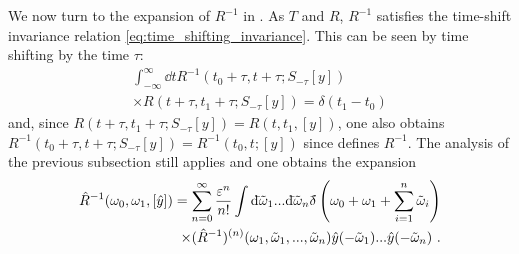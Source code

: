 \documentclass[%
 reprint,
superscriptaddress,
nofootinbib,
 amsmath,amssymb,
 aps,
prx,
]{revtex4-2}
\begin{document}
We now turn to the expansion of $R^{-1}$ in . As $T$ and $R$, $R^{-1}$ satisfies the time-shift invariance relation \eqref{eq:time_shifting_invariance}. This can be seen by time shifting  by the time $\tau$:
\begin{multline}
\int_{-\infty}^{\infty} \dd{t} R^{-1}(t_0+\tau, t+\tau;S_{-\tau}[y])\\
\times R(t+\tau, t_1+\tau;S_{-\tau}[y]) =\delta(t_1-t_0)
\end{multline}
and, since $R(t+\tau, t_1+\tau;S_{-\tau}[y]) =R(t,t_1,[y])$, one also obtains $R^{-1}(t_0+\tau, t+\tau;S_{-\tau}[y])=R^{-1}(t_0, t;[y])$ since  defines $R^{-1}$. The analysis of the previous subsection still applies and one obtains the expansion
\begin{align}
\label{eq:expansion_Rminus1}
\hat{R}^{-1}(\omega_0,\omega_1,[\hat{y}])= \sum_{n=0}^{\infty} \frac{\varepsilon^n}{n!} \int \mathrm{d}\hspace*{-0.08em}\bar{}\hspace*{0.1em}{\tilde{\omega}_1}...\mathrm{d}\hspace*{-0.08em}\bar{}\hspace*{0.1em}{\tilde{\omega}_n} \delta\hspace*{-0.24em}\bar{}\hspace*{0.1em}\,\left(\omega_0 + \omega_1 + \sum_{i=1}^n \tilde{\omega}_i\right)\\
\times (\hat{R}^{-1})^{(n)}(\omega_1,\tilde{\omega}_1,...,\tilde{\omega}_n)\hat{y}(-\tilde{\omega}_1)... \hat{y}(-\tilde{\omega}_n) ~. \nonumber
\end{align}
\end{document}
